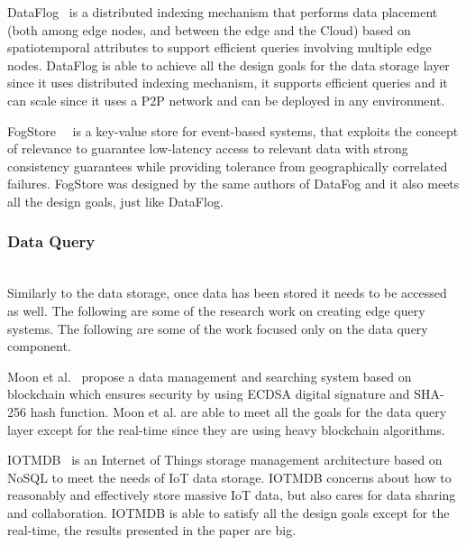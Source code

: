 DataFlog~\cite{DataFog:2018} is a distributed indexing mechanism that performs data placement (both among edge nodes, and between the edge and the Cloud) based on spatiotemporal attributes to support efficient queries involving multiple edge nodes. DataFlog is able to achieve all the design goals for the data storage layer since it uses distributed indexing mechanism, it supports efficient queries and it can scale since it uses a P2P network and can be deployed in any environment.

FogStore~\cite{Gupta:2018}~\cite{Mayer2017FogStore} is a key-value store for event-based systems, that exploits the concept of relevance to guarantee low-latency access to relevant data with strong consistency guarantees while providing tolerance from geographically correlated failures. FogStore was designed by the same authors of DataFog and it also meets all the design goals, just like DataFlog.

\subsubsection{Data Query}
\hfill\\
Similarly to the data storage, once data has been stored it needs to be accessed as well. The following are some of the research work on creating edge query systems. The following are some of the work focused only on the data query component.
 
Moon et al.~\cite{8190803} propose a data management and searching system based on blockchain which ensures security by using ECDSA digital signature and SHA-256 hash function. Moon et al. are able to meet all the goals for the data query layer except for the real-time since they are using heavy blockchain algorithms.

IOTMDB~\cite{6468294} is an Internet of Things storage management architecture based on NoSQL to meet the needs of IoT data storage. IOTMDB concerns about how to reasonably and effectively store massive IoT data, but also cares for data sharing and collaboration. IOTMDB is able to satisfy all the design goals except for the real-time, the results presented in the paper are big.

